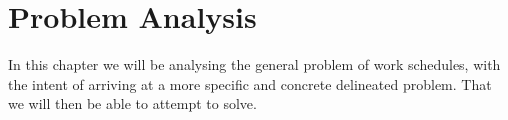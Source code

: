 \chapter{Problem Analysis}
In this chapter we will be analysing the general problem of work schedules, with the intent of arriving at a more specific and concrete delineated problem. That we will then be able to attempt to solve.